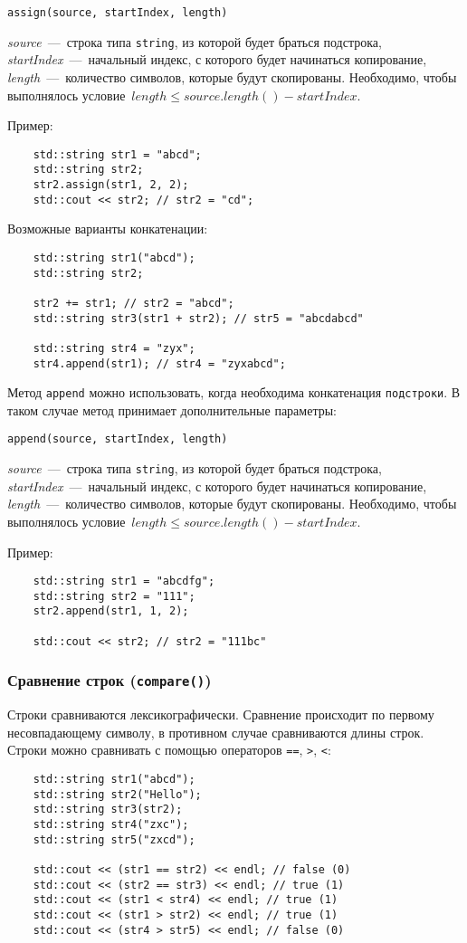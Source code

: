 \lstinline|assign(source, startIndex, length)|

\textit{source}~---~строка типа \lstinline|string|, из которой будет браться подстрока, \textit{startIndex}~---~начальный индекс, с которого будет начинаться копирование, \textit{length}~---~количество символов, которые будут скопированы.
Необходимо, чтобы выполнялось условие~$length \leqslant source.length() - startIndex$.

Пример:
\begin{lstlisting}
    std::string str1 = "abcd";
    std::string str2;
    str2.assign(str1, 2, 2);
    std::cout << str2; // str2 = "cd";
\end{lstlisting}

Возможные варианты конкатенации:
\begin{lstlisting}
    std::string str1("abcd");
    std::string str2;

    str2 += str1; // str2 = "abcd";
    std::string str3(str1 + str2); // str5 = "abcdabcd"

    std::string str4 = "zyx";
    str4.append(str1); // str4 = "zyxabcd";
\end{lstlisting}

Метод \lstinline|append| можно использовать, когда необходима конкатенация \texttt{подстроки}. В таком случае метод принимает дополнительные параметры:

\lstinline|append(source, startIndex, length)|


\textit{source}~---~строка типа \lstinline|string|, из которой будет браться подстрока, \textit{startIndex}~---~начальный индекс, с которого будет начинаться копирование, \textit{length}~---~количество символов, которые будут скопированы.
Необходимо, чтобы выполнялось условие~$length \leqslant source.length() - startIndex$.

Пример:
\begin{lstlisting}
    std::string str1 = "abcdfg";
    std::string str2 = "111";
    str2.append(str1, 1, 2);

    std::cout << str2; // str2 = "111bc"
\end{lstlisting}

\subsubsection{Сравнение строк (\texttt{compare()})}
Строки сравниваются лексикографически. Сравнение происходит по первому несовпадающему символу, в противном случае сравниваются длины строк.
Строки можно сравнивать с помощью операторов \lstinline{==}, \lstinline{>}, \lstinline{<}:
\begin{lstlisting}
    std::string str1("abcd");
    std::string str2("Hello");
    std::string str3(str2);
    std::string str4("zxc");
    std::string str5("zxcd");

    std::cout << (str1 == str2) << endl; // false (0)
    std::cout << (str2 == str3) << endl; // true (1)
    std::cout << (str1 < str4) << endl; // true (1)
    std::cout << (str1 > str2) << endl; // true (1)
    std::cout << (str4 > str5) << endl; // false (0)
\end{lstlisting}

